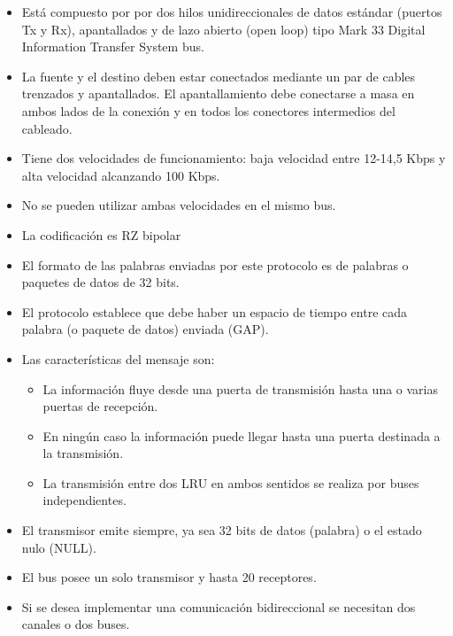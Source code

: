\begin{itemize}
\item Está compuesto por  por dos hilos unidireccionales de datos estándar (puertos Tx y Rx), apantallados y de lazo abierto (open loop) tipo 
Mark 33 Digital Information Transfer System bus.

\item La fuente y el destino deben estar conectados mediante un par de cables trenzados y apantallados. El apantallamiento debe conectarse a masa en ambos lados de la conexión y en todos los conectores intermedios del cableado.

\item Tiene dos velocidades de funcionamiento: baja velocidad entre 12-14,5 Kbps y alta velocidad alcanzando 100 Kbps. 

\item No se pueden utilizar ambas velocidades en el mismo bus.

\item La codificación  es  RZ bipolar

\item El formato de las palabras enviadas por este protocolo es  de  palabras o paquetes de datos  de  32  bits.


\item El protocolo  establece que  debe haber   un   espacio   de   tiempo   entre   cada   palabra (o paquete de datos)   enviada  (GAP).

\item      Las características del mensaje son:
  \begin{itemize}
  \item La información fluye desde una puerta de transmisión hasta una
    o varias puertas de recepción.
  \item En ningún caso la información puede llegar hasta una puerta
    destinada a la transmisión.
  \item La transmisión entre dos LRU en ambos sentidos se
    realiza por buses independientes.
  \end{itemize}

\item El transmisor emite siempre, ya sea 32 bits de datos (palabra) o el estado nulo (NULL).

\item El bus posee un  solo  transmisor  y  hasta  20  receptores.

\item  Si  se  desea implementar  una  comunicación  bidireccional  se  necesitan  dos  canales  o  dos buses.

\end{itemize}


